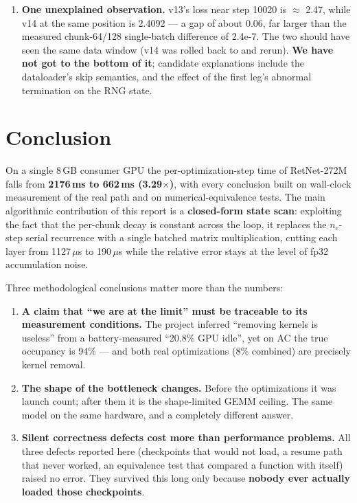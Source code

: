 \documentclass[11pt,openany]{article}
\begin{document}
\begin{enumerate}
      with falling task accuracy'' signature. The leading hypothesis awaiting test is the
      \textbf{restart of the learning rate after annealing} of
      Section~\ref{sec:en-eval-hypothesis}.
\item \textbf{One unexplained observation.} v13's loss near step 10020 is $\approx$ 2.47,
      while v14 at the same position is 2.4092 --- a gap of about 0.06, far larger than the
      measured chunk-64/128 single-batch difference of 2.4e-7. The two should have seen the
      same data window (v14 was rolled back to  and rerun).
      \textbf{We have not got to the bottom of it}; candidate explanations include the
      dataloader's skip semantics, and the effect of the first leg's abnormal termination on
      the RNG state.
\end{enumerate}

\section{Conclusion}
\label{sec:en-concl}

On a single 8\,GB consumer GPU the per-optimization-step time of RetNet-272M falls from
\textbf{2176\,ms to 662\,ms (3.29$\times$)}, with every conclusion built on wall-clock
measurement of the real  path and on numerical-equivalence tests. The main
algorithmic contribution of this report is a \textbf{closed-form state scan}: exploiting the
fact that the per-chunk decay is constant across the loop, it replaces the $n_c$-step serial
recurrence with a single batched matrix multiplication, cutting each layer from 1127\,$\mu$s
to 190\,$\mu$s while the relative error stays at the level of fp32 accumulation noise.

Three methodological conclusions matter more than the numbers:

\begin{enumerate}
\item \textbf{A claim that ``we are at the limit'' must be traceable to its measurement
      conditions.} The project inferred ``removing kernels is useless'' from a
      battery-measured ``20.8\% GPU idle'', yet on AC the true occupancy is 94\% --- and both
      real optimizations (8\% combined) are precisely kernel removal.
\item \textbf{The shape of the bottleneck changes.} Before the optimizations it was launch
      count; after them it is the shape-limited GEMM ceiling. The same model on the same
      hardware, and a completely different answer.
\item \textbf{Silent correctness defects cost more than performance problems.} All three
      defects reported here (checkpoints that would not load, a resume path that never
      worked, an equivalence test that compared a function with itself) raised no error. They
      survived this long only because \textbf{nobody ever actually loaded those checkpoints}.
\end{enumerate}
\end{document}
